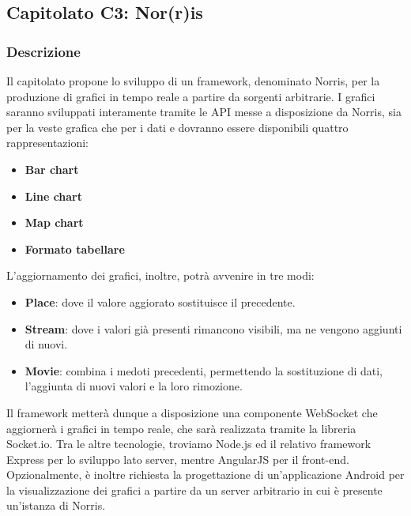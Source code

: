 
\subsection{Capitolato C3: Nor(r)is}

\subsubsection{Descrizione}
Il capitolato propone lo sviluppo di un framework, denominato Norris, per la produzione di grafici in tempo reale a partire da sorgenti arbitrarie. I grafici saranno sviluppati interamente tramite le API messe a disposizione da Norris, sia per la veste grafica che per i dati e dovranno essere disponibili quattro rappresentazioni:
\begin{itemize}
\item \textbf{Bar chart}
\item \textbf{Line chart}
\item \textbf{Map chart}
\item \textbf{Formato tabellare}
\end{itemize}
L'aggiornamento dei grafici, inoltre, potrà avvenire in tre modi: 
\begin{itemize}
\item \textbf{Place}: dove il valore aggiorato sostituisce il precedente.
\item \textbf{Stream}: dove i valori già presenti rimancono visibili, ma ne vengono aggiunti di nuovi.
\item \textbf{Movie}: combina i medoti precedenti, permettendo la sostituzione di dati, l'aggiunta di nuovi valori e la loro rimozione.
\end{itemize}
Il framework metterà dunque a disposizione una componente WebSocket che aggiornerà i grafici in tempo reale, che sarà realizzata tramite la libreria Socket.io. Tra le altre tecnologie, troviamo Node.js ed il relativo framework Express per lo sviluppo lato server, mentre AngularJS per il front-end. Opzionalmente, è inoltre richiesta la progettazione di un'applicazione Android per la visualizzazione dei grafici a partire da un server arbitrario in cui è presente un'istanza di Norris.

